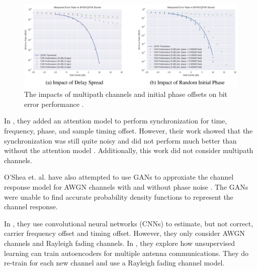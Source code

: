 \begin{figure}
\begin{center}
\includegraphics[width=16cm]{figures/osheaatt2.png}
\caption{The impacts of multipath channels and initial phase offsets on bit error performance \cite{osheaatt}.}
\label{fig:oshea}
\end{center}
\end{figure}

In \cite{osheasynch}, they added an attention model to perform synchronization for time, frequency, phase, and sample timing offset.  However, their work showed that the synchronization was still quite noisy and did not perform much better than without the attention model \cite{osheaatt}.  Additionally, this work did not consider multipath channels. 

O'Shea et. al. have also attempted to use GANs to approxiate the channel response model for AWGN channels with and without phase noise \cite{osheavoid}.  The GANs were unable to find accurate probability density functions to represent the channel response.  

In \cite{osheacsi}, they use convolutional neural networks (CNNs) to estimate, but not correct, carrier frequency offset and timing offset.  However, they only consider AWGN channels and Rayleigh fading channels.  
In \cite{osheamimo}, they explore how unsupervised learning can train autoencoders for multiple antenna communications.  They do re-train for each new channel and use a Rayleigh fading channel model.